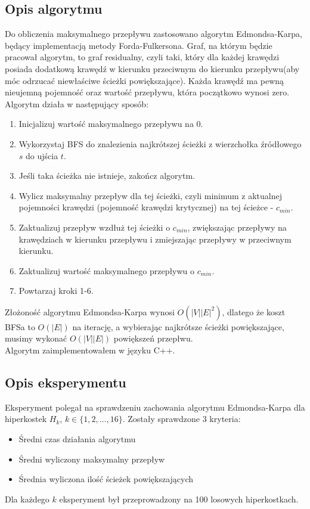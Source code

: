 \documentclass{article}
\begin{document}
\subsection{Opis algorytmu}
Do obliczenia maksymalnego przepływu zastosowano algorytm Edmondsa-Karpa, będący implementacją metody Forda-Fulkersona.
Graf, na którym będzie pracował algorytm, to graf residualny, czyli taki, który dla każdej krawędzi posiada dodatkową krawędź w kierunku przeciwnym do kierunku przepływu(aby móc odrzucać niewłaściwe ścieżki powiększające).
Każda krawędź ma pewną nieujemną pojemność oraz wartość przepływu, która początkowo wynosi zero.
Algorytm działa w następujący sposób:
\begin{enumerate}
\item Inicjalizuj wartość maksymalnego przepływu na 0.
\item Wykorzystaj BFS do znalezienia najkrótszej ścieżki z wierzchołka źródłowego $s$ do ujścia $t$.
\item Jeśli taka ścieżka nie istnieje, zakończ algorytm.
\item Wylicz maksymalny przepływ dla tej ścieżki, czyli minimum z aktualnej pojemności krawędzi (pojemność krawędzi krytycznej) na tej ścieżce - $c_{min}$.
\item Zaktualizuj przepływ wzdłuż tej ścieżki o $c_{min}$, zwiększając przepływy na krawędziach w kierunku przepływu i zmiejszając przepływy w przeciwnym kierunku.
\item Zaktualizuj wartość maksymalnego przepływu o $c_{min}$.
\item Powtarzaj kroki 1-6.\\
\end{enumerate}

Złożoność algorytmu Edmondsa-Karpa wynosi $O(|V||E|^2)$, dlatego że koszt BFSa to $O(|E|)$ na iterację, a wybierając najkrótsze ścieżki powiększające, musimy wykonać $O(|V||E|)$ powiększeń przepłwu.\\

Algorytm zaimplementowałem w języku C++.

\subsection{Opis eksperymentu}
Eksperyment polegał na sprawdzeniu zachowania algorytmu Edmondsa-Karpa dla hiperkostek $H_k$, $k \in \{1, 2, \dots, 16\}$.
Zostały sprawdzone 3 kryteria:
\begin{itemize}
\item Średni czas działania algorytmu
\item Średni wyliczony maksymalny przepływ
\item Średnia wyliczona ilość ścieżek powiększających
\end{itemize}
Dla każdego $k$ eksperyment był przeprowadzony na 100 losowych hiperkostkach.
\end{document}
